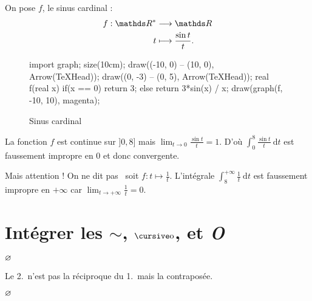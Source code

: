 \begin{exm}
	On pose $f$, le sinus cardinal :  \begin{align*}
		f: \R^* &\longrightarrow \R \\
		t &\longmapsto \frac{\sin t}{t}.
	\end{align*}
	\begin{figure}[H]
		\centering
		\begin{asy}
			import graph;
			size(10cm);
			draw((-10, 0) -- (10, 0), Arrow(TeXHead));
			draw((0, -3) -- (0, 5), Arrow(TeXHead));
			real f(real x) {
				if(x == 0) { return 3; }
				else {return 3*sin(x) / x;}
			}
			draw(graph(f, -10, 10), magenta);
		\end{asy}
		\caption{Sinus cardinal}
	\end{figure}

	La fonction $f$\/ est continue sur ${]0,8]}$\/ mais $\lim_{t\to 0} \frac{\sin t}{t} = 1$. D'où $\int_{0}^{8} \frac{\sin t}{t}~\mathrm{d}t$\/ est faussement impropre en $0$\/ et donc convergente.


	Mais attention ! On ne dit pas \guillemotleft~{\color{red}soit $f : t \mapsto \frac{1}{t}$. L'intégrale $\int_{8}^{+\infty} \frac{1}{t}~\mathrm{d}t$\/ est faussement impropre en $+\infty$\/ car $\lim_{t\to +\infty}\frac{1}{t} = 0$}.~\guillemotright
\end{exm}

\section{Intégrer les $\mathbf{\sim}$, $\po$, et \textit{O}}

\begin{thm}
	\hfill$\varnothing$\hfill\null
\end{thm}

\begin{thm}
	Le 2.\ n'est pas la réciproque du 1.\ mais la contraposée.
\end{thm}

\begin{prop}
	\hfill$\varnothing$\hfill\null
\end{prop}

